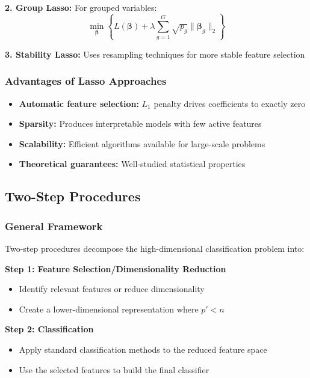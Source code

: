 \documentclass[12pt,a4paper]{article}
\begin{document}
\textbf{2. Group Lasso:} For grouped variables:
\begin{equation}
\min_{\boldsymbol{\beta}} \left\{ L(\boldsymbol{\beta}) + \lambda \sum_{g=1}^G \sqrt{p_g} \|\boldsymbol{\beta}_g\|_2 \right\}
\end{equation}

\textbf{3. Stability Lasso:} Uses resampling techniques for more stable feature selection

\subsubsection{Advantages of Lasso Approaches}

\begin{itemize}
    \item \textbf{Automatic feature selection:} $L_1$ penalty drives coefficients to exactly zero
    \item \textbf{Sparsity:} Produces interpretable models with few active features
    \item \textbf{Scalability:} Efficient algorithms available for large-scale problems
    \item \textbf{Theoretical guarantees:} Well-studied statistical properties
\end{itemize}

\subsection{Two-Step Procedures}

\subsubsection{General Framework}

Two-step procedures decompose the high-dimensional classification problem into:

\textbf{Step 1: Feature Selection/Dimensionality Reduction}
\begin{itemize}
    \item Identify relevant features or reduce dimensionality
    \item Create a lower-dimensional representation where $p' < n$
\end{itemize}

\textbf{Step 2: Classification}
\begin{itemize}
    \item Apply standard classification methods to the reduced feature space
    \item Use the selected features to build the final classifier
\end{itemize}
\end{document}
